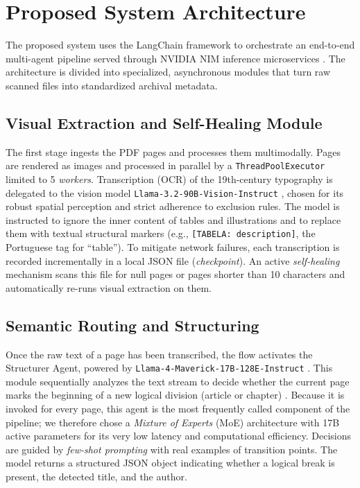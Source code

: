 \documentclass[conference]{IEEEtran}
\begin{document}
\section{Proposed System Architecture}

The proposed system uses the LangChain framework \cite{LangChain} to orchestrate an end-to-end multi-agent pipeline served through NVIDIA NIM inference microservices \cite{nvidia_nim}. The architecture is divided into specialized, asynchronous modules that turn raw scanned files into standardized archival metadata.

\subsection{Visual Extraction and Self-Healing Module}

The first stage ingests the PDF pages and processes them multimodally. Pages are rendered as images and processed in parallel by a \texttt{ThreadPoolExecutor} limited to 5 \textit{workers}. Transcription (OCR) of the 19th-century typography is delegated to the vision model \texttt{Llama-3.2-90B-Vision-Instruct} \cite{llama3_vision}, chosen for its robust spatial perception and strict adherence to exclusion rules. The model is instructed to ignore the inner content of tables and illustrations and to replace them with textual structural markers (e.g., \texttt{[TABELA: description]}, the Portuguese tag for ``table''). To mitigate network failures, each transcription is recorded incrementally in a local JSON file (\textit{checkpoint}). An active \textit{self-healing} mechanism scans this file for null pages or pages shorter than 10 characters and automatically re-runs visual extraction on them.

\subsection{Semantic Routing and Structuring}

Once the raw text of a page has been transcribed, the flow activates the Structurer Agent, powered by \texttt{Llama-4-Maverick-17B-128E-Instruct} \cite{llama4_maverick}. This module sequentially analyzes the text stream to decide whether the current page marks the beginning of a new logical division (article or chapter) \cite{zeroshotsemanticsegmentation}. Because it is invoked for every page, this agent is the most frequently called component of the pipeline; we therefore chose a \textit{Mixture of Experts} (MoE) architecture with 17B active parameters for its very low latency and computational efficiency. Decisions are guided by \textit{few-shot prompting} with real examples of transition points. The model returns a structured JSON object indicating whether a logical break is present, the detected title, and the author.
\end{document}
